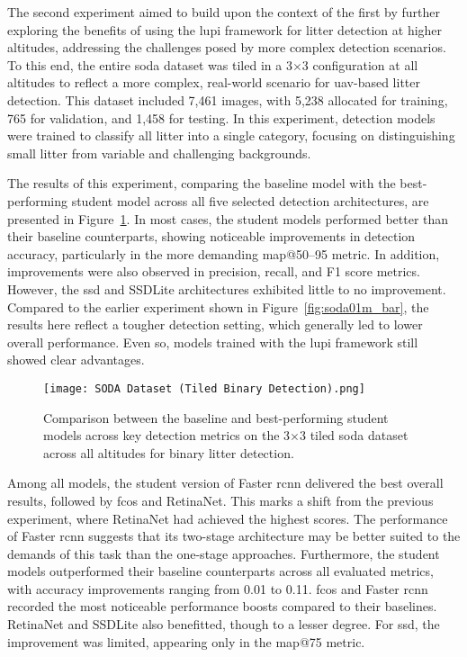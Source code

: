 The second experiment aimed to build upon the context of the first by further exploring the benefits of using the \gls{lupi} framework for litter detection at higher altitudes, addressing the challenges posed by more complex detection scenarios. To this end, the entire \gls{soda} dataset was tiled in a 3$\times$3 configuration at all altitudes to reflect a more complex, real-world scenario for \gls{uav}-based litter detection. This dataset included 7,461 images, with 5,238 allocated for training, 765 for validation, and 1,458 for testing. In this experiment, detection models were trained to classify all litter into a single category, focusing on distinguishing small litter from variable and challenging backgrounds.

The results of this experiment, comparing the baseline model with the best-performing student model across all five selected detection architectures, are presented in Figure~\ref{fig:soda_tiled_single_bar}. In most cases, the student models performed better than their baseline counterparts, showing noticeable improvements in detection accuracy, particularly in the more demanding \gls{map}@50–95 metric. In addition, improvements were also observed in precision, recall, and F1 score metrics. However, the \gls{ssd} and SSDLite architectures exhibited little to no improvement.
Compared to the earlier experiment shown in Figure~\ref{fig:soda01m_bar}, the results here reflect a tougher detection setting, which generally led to lower overall performance. Even so, models trained with the \gls{lupi} framework still showed clear advantages. 

\begin{figure}[!ht]
    \centering
    \texttt{[image: SODA Dataset (Tiled Binary Detection).png]}
    \caption{Comparison between the baseline and best-performing student models across key detection metrics on the 3$\times$3 tiled \gls{soda} dataset across all altitudes for binary litter detection.}
    \label{fig:soda_tiled_single_bar}
\end{figure}

Among all models, the student version of Faster \gls{rcnn} delivered the best overall results, followed by \gls{fcos} and RetinaNet. This marks a shift from the previous experiment, where RetinaNet had achieved the highest scores. The performance of Faster \gls{rcnn} suggests that its two-stage architecture may be better suited to the demands of this task than the one-stage approaches. Furthermore, the student models outperformed their baseline counterparts across all evaluated metrics, with accuracy improvements ranging from 0.01 to 0.11. \gls{fcos} and Faster \gls{rcnn} recorded the most noticeable performance boosts compared to their baselines. RetinaNet and SSDLite also benefitted, though to a lesser degree. For \gls{ssd}, the improvement was limited, appearing only in the \gls{map}@75 metric.

